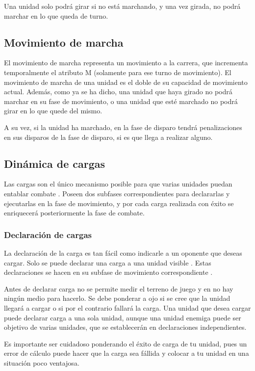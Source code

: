 Una unidad solo podrá girar si no está marchando, y una vez girada, no
podrá marchar en lo que queda de turno.

\subsection*{Movimiento de marcha}
\label{marcha}
El movimiento de marcha representa un movimiento a la carrera, que
incrementa temporalmente el atributo M (solamente para ese turno de
movimiento). El movimiento de marcha de una unidad es el doble de su
capacidad de movimiento actual. Además, como ya se ha dicho, una unidad que
haya girado no podrá marchar en su fase de movimiento, o una unidad
que esté marchado no podrá girar en lo que quede del mismo.

A su vez, si la unidad ha marchado, en la fase de disparo tendrá
penalizaciones en sus disparos de la fase de disparo, si es que llega
a realizar alguno.

\subsection*{Dinámica de cargas}
\label{dinamica}
Las cargas son el único mecanismo posible para que varias unidades
puedan entablar combate . Poseen dos subfases correspondientes para
declararlas y ejecutarlas en la fase de movimiento, y por cada carga
realizada con éxito se enriquecerá posteriormente la fase de combate.

\subsubsection*{Declaración de cargas}
\label{declaracion}
La declaración de la carga es tan fácil como indicarle a un oponente
que deseas cargar. Solo se puede declarar una carga a una unidad
visible . Estas declaraciones se hacen en su subfase de
movimiento correspondiente .

Antes de declarar carga no se permite medir el terreno de juego y en
\gom no hay ningún medio para hacerlo. Se debe ponderar a ojo si se cree
que la unidad llegará a cargar o si por el contrario fallará la
carga. Una unidad que desea cargar puede declarar carga a una sola
unidad, aunque una unidad enemiga puede ser objetivo de varias
unidades, que se establecerán en declaraciones independientes.

Es importante ser cuidadoso ponderando el éxito de carga de tu unidad,
pues un error de cálculo puede hacer que la carga sea fállida
 y colocar a tu unidad en una situación poco
ventajosa.

